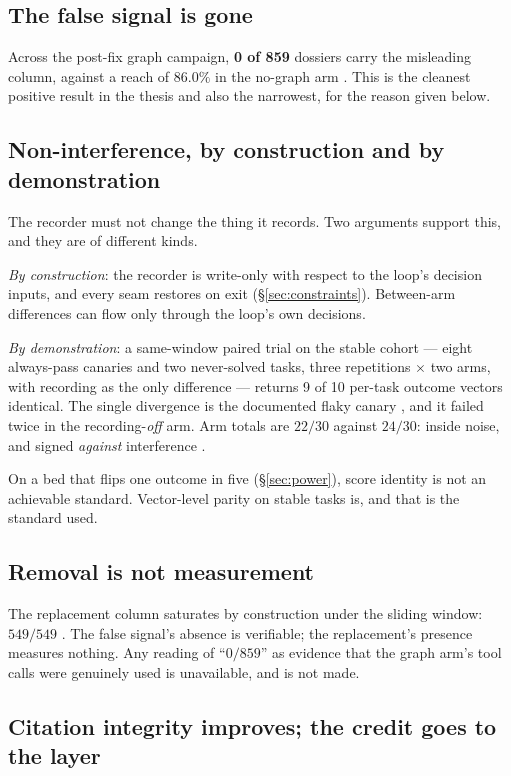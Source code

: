 \subsection*{The false signal is gone}

Across the post-fix graph campaign, \textbf{0 of 859} dossiers carry the
misleading column, against a reach of $86.0\%$ in the no-graph arm
. This is the cleanest positive result in the thesis and also the
narrowest, for the reason given below.

\subsection*{Non-interference, by construction and by demonstration}

The recorder must not change the thing it records. Two arguments support
this, and they are of different kinds.

\emph{By construction}: the recorder is write-only with respect to the
loop's decision inputs, and every seam restores on exit
(\S\ref{sec:constraints}). Between-arm differences can flow only through
the loop's own decisions.

\emph{By demonstration}: a same-window paired trial on the stable cohort
--- eight always-pass canaries and two never-solved tasks, three
repetitions $\times$ two arms, with recording as the only difference ---
returns 9 of 10 per-task outcome vectors identical. The single divergence
is the documented flaky canary , and it failed twice in the
recording-\emph{off} arm. Arm totals are $22/30$ against $24/30$: inside
noise, and signed \emph{against} interference .

On a bed that flips one outcome in five (\S\ref{sec:power}), score identity
is not an achievable standard. Vector-level parity on stable tasks is, and
that is the standard used.

\subsection*{Removal is not measurement}

The replacement column saturates by construction under the sliding window:
$549/549$ . The false signal's absence is verifiable; the
replacement's presence measures nothing. Any reading of
``$0/859$'' as evidence that the graph arm's tool calls were genuinely used
is unavailable, and is not made.

\subsection*{Citation integrity improves; the credit goes to the layer}

